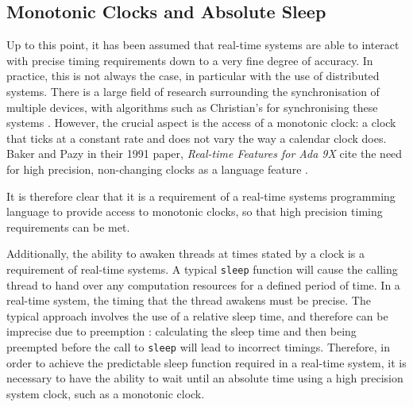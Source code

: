\subsection{Monotonic Clocks and Absolute Sleep}
Up to this point, it has been assumed that real-time systems are able to
interact with precise timing requirements down to a very fine degree of
accuracy.  In practice, this is not always the case, in particular with the use
of distributed systems. There is a large field of research surrounding the
synchronisation of multiple devices, with algorithms such as Christian's for
synchronising these systems \cite{37958}. However, the crucial aspect is the
access of a monotonic clock: a clock that ticks at a constant rate and does
not vary the way a calendar clock does. Baker and Pazy in their 1991 paper,
\emph{ Real-time Features for Ada 9X} cite the need for high precision,
non-changing clocks as a language feature \cite{160371}.  
\par\bigskip\noindent
It is therefore clear that it is a requirement of a real-time systems
programming language to provide access to monotonic clocks, so that high
precision timing requirements can be met.  
\par\bigskip\noindent
Additionally,
the ability to awaken threads at times stated by a clock is a requirement of
real-time systems. A typical \texttt{sleep} function will cause the calling
thread to hand over any computation resources for a defined period of time.  In
a real-time system, the timing that the thread awakens must be precise.  The
typical approach involves the use of a relative sleep time, and therefore can
be imprecise due to preemption \cite{real-time-systems}: calculating the sleep
time and then being preempted before the call to \texttt{sleep} will lead to
incorrect timings. Therefore, in order to achieve the predictable sleep function
required in a real-time system, it is necessary to have the ability to wait
until an absolute time using a high precision system clock, such as a monotonic
clock.

